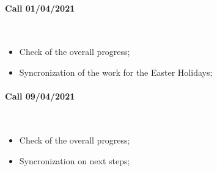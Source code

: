 \documentclass[12pt,a4paper]{report}
\begin{document}
\paragraph{Call 01/04/2021 \\}~

\begin{itemize}
	\item Check of the overall progress;
	
	\item Syncronization of the work for the Easter Holidays;

\end{itemize}

\paragraph{Call 09/04/2021 \\}~

\begin{itemize}
	\item Check of the overall progress;
	
	\item Syncronization on next steps;
	
\end{itemize}
\end{document}
